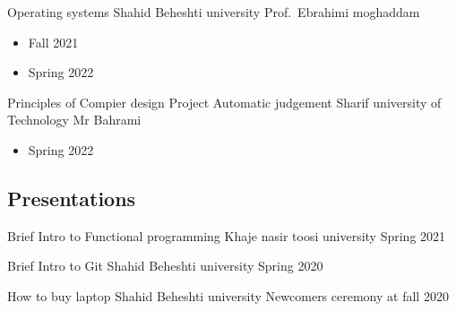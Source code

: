 \cventry{}
  {Operating systems}
  {}
  {Shahid Beheshti university}
  {Prof.\ Ebrahimi moghaddam}
  {%
    \begin{itemize}
      \item Fall 2021
      \item Spring 2022
    \end{itemize}
  }

\cventry{}
  {Principles of Compier design}
  {Project Automatic judgement}
  {Sharif university of Technology}
  {Mr Bahrami}
  {%
    \begin{itemize}
      \item Spring 2022
    \end{itemize}
   }

\subsection{Presentations}

\cventry{}
  {Brief Intro to Functional programming}
  {}
  {Khaje nasir toosi university}
  {}
  {Spring 2021}


\cventry{}
  {Brief Intro to Git}
  {}
  {Shahid Beheshti university}
  {}
  {Spring 2020}


\cventry{}
  {How to buy laptop}
  {}
  {Shahid Beheshti university}
  {}
  {Newcomers ceremony at fall 2020}

